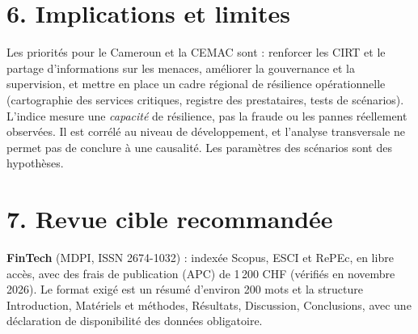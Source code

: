 \documentclass[11pt,a4paper]{article}
\begin{document}
\section*{6. Implications et limites}
Les priorités pour le Cameroun et la CEMAC sont : renforcer les CIRT et le partage d'informations sur les menaces, améliorer la gouvernance et la supervision, et mettre en place un cadre régional de résilience opérationnelle (cartographie des services critiques, registre des prestataires, tests de scénarios). L'indice mesure une \emph{capacité} de résilience, pas la fraude ou les pannes réellement observées. Il est corrélé au niveau de développement, et l'analyse transversale ne permet pas de conclure à une causalité. Les paramètres des scénarios sont des hypothèses.

\section*{7. Revue cible recommandée}
\textbf{FinTech} (MDPI, ISSN 2674-1032) : indexée Scopus, ESCI et RePEc, en libre accès, avec des frais de publication (APC) de 1\,200 CHF (vérifiés en novembre 2026). Le format exigé est un résumé d'environ 200 mots et la structure Introduction, Matériels et méthodes, Résultats, Discussion, Conclusions, avec une déclaration de disponibilité des données obligatoire.
\end{document}
